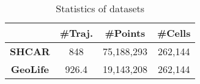 \documentclass[10pt,conference,letterpaper]{IEEEtran}
\begin{document}
%
%

\begin{table}[t]
	\renewcommand{\arraystretch}{1.1}
	
	\caption{Statistics of datasets}\label{tab:datasets}
	\vspace{-.1in}
	\centering
	\scriptsize{
		\begin{tabular}{|c|c|c|c|}
			\hline
			& \textbf{\#Traj.} &  \textbf{\#Points} & \textbf{\#Cells}\\
			\hline
			\textbf{SHCAR} & 848 & 75,188,293& 262,144\\
			\hline
			\textbf{GeoLife} & 926.4 & 19,143,208& 262,144\\
			\hline
		\end{tabular}
	}
	\vspace{-.1in}
\end{table}
\end{document}
